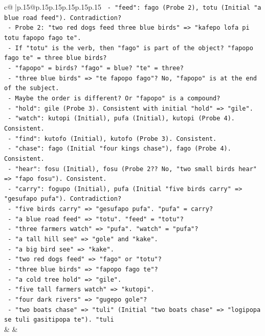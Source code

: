 \documentclass{article}
\begin{document}
{\begin{supertabular}{c@{$\;$}|p{.15\linewidth}@{}p{.15\linewidth}p{.15\linewidth}p{.15\linewidth}p{.15\linewidth}p{.15\linewidth}}
{{{\texttt{  {-} "feed": fago (Probe 2), totu (Initial "a blue road feed"). Contradiction?} \\
\texttt{    {-} Probe 2: "two red dogs feed three blue birds" => "kafepo lofa pi totu fapopo fago te".} \\
\texttt{    {-} If "totu" is the verb, then "fago" is part of the object? "fapopo fago te" = three blue birds?} \\
\texttt{    {-} "fapopo" = birds? "fago" = blue? "te" = three?} \\
\texttt{    {-} "three blue birds" => "te fapopo fago"? No, "fapopo" is at the end of the subject.} \\
\texttt{    {-} Maybe the order is different? Or "fapopo" is a compound?} \\
\texttt{  {-} "hold": gile (Probe 3). Consistent with initial "hold" => "gile".} \\
\texttt{  {-} "watch": kutopi (Initial), pufa (Initial), kutopi (Probe 4). Consistent.} \\
\texttt{  {-} "find": kutofo (Initial), kutofo (Probe 3). Consistent.} \\
\texttt{  {-} "chase": fago (Initial "four kings chase"), fago (Probe 4). Consistent.} \\
\texttt{  {-} "hear": fosu (Initial), fosu (Probe 2?? No, "two small birds hear" => "fapo fosu"). Consistent.} \\
\texttt{  {-} "carry": fogupo (Initial), pufa (Initial "five birds carry" => "gesufapo pufa"). Contradiction?} \\
\texttt{    {-} "five birds carry" => "gesufapo pufa". "pufa" = carry?} \\
\texttt{    {-} "a blue road feed" => "totu". "feed" = "totu"?} \\
\texttt{    {-} "three farmers watch" => "pufa". "watch" = "pufa"?} \\
\texttt{    {-} "a tall hill see" => "gole" and "kake".} \\
\texttt{    {-} "a big bird see" => "kake".} \\
\texttt{    {-} "two red dogs feed" => "fago" or "totu"?} \\
\texttt{    {-} "three blue birds" => "fapopo fago te"?} \\
\texttt{    {-} "a cold tree hold" => "gile".} \\
\texttt{    {-} "five tall farmers watch" => "kutopi".} \\
\texttt{    {-} "four dark rivers" => "gugepo gole"?} \\
\texttt{    {-} "two boats chase" => "tuli" (Initial "two boats chase" => "logipopa se tuli gasitipopa te"). "tuli} \\
            }
        }
    }
    & & \\ \\


\end{supertabular}}
\end{document}
